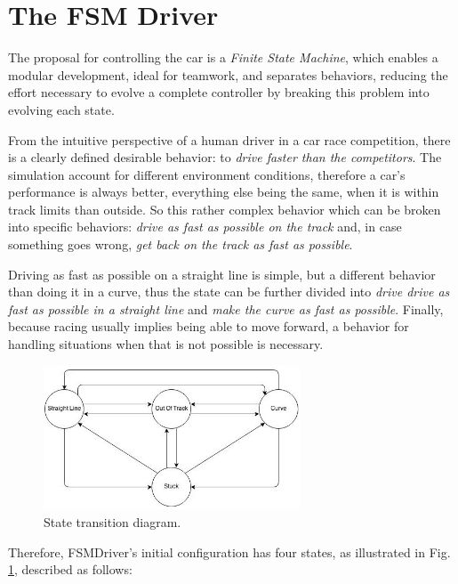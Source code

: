 \section{The FSM Driver}\label{sec:fsm}
The proposal for controlling the car is a \emph{Finite State Machine}, which
enables a modular development, ideal for teamwork, and separates behaviors, reducing
the effort necessary to evolve a complete controller by breaking this problem into
evolving each state.

From the intuitive perspective of a human driver in a car race competition, there 
is a clearly defined desirable behavior: to \emph{drive faster than the competitors}.
The simulation account for different environment conditions, therefore a car's 
performance is always better, everything else being the same, when it is within 
track limits than outside. So this rather complex behavior which can be broken into specific behaviors: \emph{drive as fast as possible on the track} and, 
in case something goes wrong, \emph{get back on the track as fast as possible}.

Driving as fast as possible on a straight line is simple, but a different behavior
than doing it in a curve, thus the state can be further divided into \emph{drive
drive as fast as possible in a straight line} and \emph{make the
curve as fast as possible}. Finally, because racing usually implies being able to
move forward, a behavior for handling situations when that is not possible is 
necessary.

\begin{figure}
	\centering
	\includegraphics[width=3in]{StatesDiagram}
	\caption{State transition diagram.}
	\label{fig:fsm}
\end{figure}

Therefore, FSMDriver's initial configuration has four states, as illustrated in 
Fig. \ref{fig:fsm}, described as follows: 

